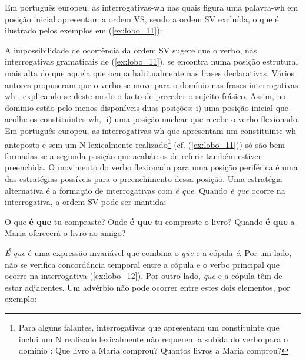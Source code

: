 \documentclass[output=paper]{LSP/langsci}
\begin{document}
Em português europeu, as interrogativas-wh nas quais figura uma palavra-wh em posição inicial apresentam a ordem VS, sendo a ordem SV excluída, o que é ilustrado pelos exemplos em (\ref{ex:lobo_11}):

\ea\label{ex:lobo_11}
\zl

A impossibilidade de ocorrência da ordem SV sugere que o verbo, nas interrogativas gramaticais de (\ref{ex:lobo_11}), se encontra numa posição estrutural mais alta do que aquela que ocupa habitualmente nas frases declarativas. Vários autores propuseram que o verbo se move para o domínio  nas frases interrogativas-wh \citep{brito1982,rouveret1992,ambar1988,soares2006}, explicando-se deste modo o facto de preceder o sujeito frásico. Assim, no domínio  estão pelo menos disponíveis duas posições: i) uma posição inicial que acolhe os constituintes-wh, ii) uma posição nuclear que recebe o verbo flexionado. Em português europeu, as interrogativas-wh que apresentam um constituinte-wh anteposto e sem um N lexicalmente realizado\largerpage[2]\footnote{
Para alguns falantes, interrogativas que apresentam um constituinte que inclui um N realizado lexicalmente não requerem a subida do verbo para o domínio  \citep{ambar2003,mateus_etal2003}:
\ea\label{ex:lobo_i}
\ea\label{ex:lobo_ia} Que livro a Maria comprou?
\ex\label{ex:lobo_ib} Quantos livros a Maria comprou?
\zl} (cf. (\ref{ex:lobo_11})) só são bem formadas se a segunda posição que acabámos de referir também estiver preenchida. O movimento do verbo flexionado para uma posição periférica é uma das estratégias possíveis para o preenchimento dessa posição. Uma estratégia alternativa é a formação de interrogativas com \textit{é que}. Quando \textit{é que} ocorre na interrogativa, a ordem SV pode ser mantida:

\ea\label{ex:lobo_12}
\ea\label{ex:lobo_12a} O que \textbf{é que} tu compraste?
\ex\label{ex:lobo_12b} Onde \textbf{é que} tu compraste o livro?
\ex\label{ex:lobo_12c} Quando \textbf{é que} a Maria oferecerá o livro ao amigo?
\zl

\textit{É que} é uma expressão invariável que combina o  \textit{que} e a cópula \textit{é}. Por um lado, não se verifica concordância temporal entre a cópula e o verbo principal que ocorre na interrogativa (\ref{ex:lobo_12}). Por outro lado, \textit{que} e a cópula têm de estar adjacentes. Um advérbio não pode ocorrer entre estes dois elementos, por exemplo:
\end{document}
